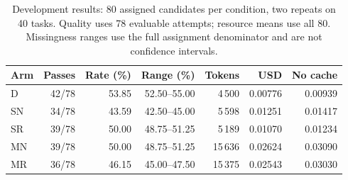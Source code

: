 \begin{table}[htbp]\centering\small
\caption{Development results: 80 assigned candidates per condition, two repeats on 40 tasks. Quality uses 78 evaluable attempts; resource means use all 80. Missingness ranges use the full assignment denominator and are not confidence intervals.}\label{tab:dev40-main}
\begin{tabular}{lrrrrrr}\toprule
Arm & Passes & Rate (\%) & Range (\%) & Tokens & USD & No cache\\
\midrule
D & 42/78 & 53.85 & 52.50--55.00 & 4\,500 & 0.00776 & 0.00939\\
SN & 34/78 & 43.59 & 42.50--45.00 & 5\,598 & 0.01251 & 0.01417\\
SR & 39/78 & 50.00 & 48.75--51.25 & 5\,189 & 0.01070 & 0.01234\\
MN & 39/78 & 50.00 & 48.75--51.25 & 15\,636 & 0.02624 & 0.03090\\
MR & 36/78 & 46.15 & 45.00--47.50 & 15\,375 & 0.02543 & 0.03030\\
\bottomrule\end{tabular}\end{table}
